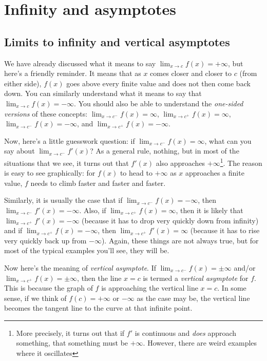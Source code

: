 \documentclass[10pt]{amsart}
\begin{document}
\section{Infinity and asymptotes}

\subsection{Limits to infinity and vertical asymptotes}

We have already discussed what it means to say $\lim_{x \to c} f(x) =
+\infty$, but here's a friendly reminder. It means that as $x$ comes
closer and closer to $c$ (from either side), $f(x)$ goes above every
finite value and does not then come back down. You can similarly
understand what it means to say that $\lim_{x \to c} f(x) = -
\infty$. You should also be able to understand the {\em one-sided
versions} of these concepts: $\lim_{x \to c^-} f(x) = \infty$,
$\lim_{x \to c^+} f(x) = \infty$, $\lim_{x \to c^-} f(x) = -\infty$,
and $\lim_{x \to c^+} f(x) = -\infty$.

Now, here's a little guesswork question: if $\lim_{x \to c^-} f(x) =
\infty$, what can you say about $\lim_{x \to c^-} f'(x)$? As a general
rule, nothing, but in most of the situations that we see, it turns out
that $f'(x)$ also approaches $+\infty$\footnote{More precisely, it
turns out that if $f'$ is continuous and {\em does} approach
something, that something must be $+\infty$. However, there are weird
examples where it oscillates}. The reason is easy to see graphically:
for $f(x)$ to head to $+\infty$ as $x$ approaches a finite value, $f$
needs to climb faster and faster and faster.

Similarly, it is usually the case that if $\lim_{x \to c^-} f(x) =
-\infty$, then $\lim_{x \to c^-} f'(x) = -\infty$. Also, if $\lim_{x
  \to c^+} f(x) = \infty$, then it is likely that $\lim_{x \to c^+}
f'(x) = -\infty$ (because it has to drop very quickly down from
infinity) and if $\lim_{x \to c^+} f(x) = -\infty$, then $\lim_{x \to
  c^+} f'(x) = \infty$ (because it has to rise very quickly back up
from $-\infty$). Again, these things are not always true, but for most
of the typical examples you'll see, they will be.

Now here's the meaning of {\em vertical asymptote}. If $\lim_{x \to
c^-} f(x) = \pm \infty$ and/or $\lim_{x \to c^+} f(x) = \pm \infty$,
then the line $x = c$ is termed a {\em vertical asymptote} for
$f$. This is because the graph of $f$ is approaching the vertical line
$x = c$. In some sense, if we think of $f(c) = +\infty$ or $-\infty$
as the case may be, the vertical line becomes the tangent line to the
curve at that infinite point.
\end{document}
